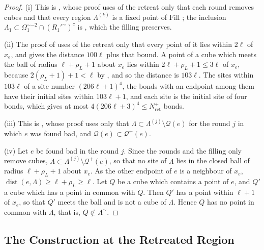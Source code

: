\documentclass[11pt]{preprint}
\newcommand{\dist}{\operatorname{dist}}
\numberwithin{equation}{section}
\theoremstyle{definition}
\theoremstyle{remark}
\theoremstyle{plain}
\begin{document}
\begin{proof}
(i) This is \cite[Lemma~9.12(i)]{WilsonFirstStep}, whose proof uses of the retreat only that each round removes cubes and that every region $\Lambda^{(k)}$ is a fixed point of $\mathrm{Fill}$ \cite[Lemma~9.10(c)]{WilsonFirstStep}; the inclusion $\Lambda_1 \subset \Omega_1^{\sim-2} \cap (R_1'^{\sim})^c$ is \cite[(1.20), p.~251]{BalabanCRE}, which the filling preserves.

(ii) The proof of \cite[Lemma~9.10(c), (d)]{WilsonFirstStep} uses of the retreat only that every point of it lies within $2\ell$ of $x_e$, and gives the distance $100\ell$ plus that bound. A point of a cube which meets the ball of radius $\ell + \rho_L + 1$ about $x_e$ lies within $2\ell + \rho_L + 1 \leq 3\ell$ of $x_e$, because $2(\rho_L + 1) + 1 < \ell$ by \cite[(3.1)]{WilsonFirstStep}, and so the distance is $103\ell$. The sites within $103\ell$ of a site number $(206\ell + 1)^4$, the bonds with an endpoint among them have their initial sites within $103\ell + 1$, and each site is the initial site of four bonds, which gives at most $4(206\ell + 3)^4 \leq N^+_{\mathrm{ret}}$ bonds.

(iii) This is \cite[Lemma~9.10(b)]{WilsonFirstStep}, whose proof uses only that $\Lambda \subset \Lambda^{(j)} \setminus \mathcal Q(e)$ for the round $j$ in which $e$ was found bad, and $\mathcal Q(e) \subset \mathcal Q^+(e)$.

(iv) Let $e$ be found bad in the round $j$. Since the rounds and the filling only remove cubes, $\Lambda \subset \Lambda^{(j)} \setminus \mathcal Q^+(e)$, so that no site of $\Lambda$ lies in the closed ball of radius $\ell + \rho_L + 1$ about $x_e$. As the other endpoint of $e$ is a neighbour of $x_e$, $\dist(e, \Lambda) \geq \ell + \rho_L \geq \ell$. Let $Q$ be a cube which contains a point of $e$, and $Q'$ a cube which has a point in common with $Q$. Then $Q'$ has a point within $\ell + 1$ of $x_e$, so that $Q'$ meets the ball and is not a cube of $\Lambda$. Hence $Q$ has no point in common with $\Lambda$, that is, $Q \not\subset \Lambda^\sim$.
\end{proof}

\subsection{The Construction at the Retreated Region}\label{sec:retreated-construction}
\end{document}
